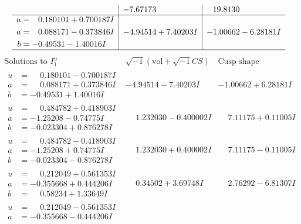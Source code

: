 \documentclass[1p]{elsarticle_modified}
\theoremstyle{definition}
\newcommand{\I}{\sqrt{-1}}
\begin{document}
$$\begin{array}{c|c|c}
 & -7.67173\phantom{ +0.000000I} & \phantom{-}19.8130\phantom{ +0.000000I} \\ \hline\begin{aligned}
u &= \phantom{-}0.180101 + 0.700187 I \\
a &= \phantom{-}0.088171 - 0.373846 I \\
b &= -0.49531 - 1.40016 I\end{aligned}
 & -4.94514 + 7.40203 I & -1.00662 - 6.28181 I\\
 \hline 
 \end{array}$$\newpage$$\begin{array}{c|c|c}  
\text{Solutions to }I^u_{1}& \I (\text{vol} + \sqrt{-1}CS) & \text{Cusp shape}\\
 \hline 
\begin{aligned}
u &= \phantom{-}0.180101 - 0.700187 I \\
a &= \phantom{-}0.088171 + 0.373846 I \\
b &= -0.49531 + 1.40016 I\end{aligned}
 & -4.94514 - 7.40203 I & -1.00662 + 6.28181 I \\ \hline\begin{aligned}
u &= \phantom{-}0.484782 + 0.418903 I \\
a &= -1.25208 - 0.74775 I \\
b &= -0.023304 + 0.876278 I\end{aligned}
 & \phantom{-}1.232030 - 0.400002 I & \phantom{-}7.11175 + 0.11005 I \\ \hline\begin{aligned}
u &= \phantom{-}0.484782 - 0.418903 I \\
a &= -1.25208 + 0.74775 I \\
b &= -0.023304 - 0.876278 I\end{aligned}
 & \phantom{-}1.232030 + 0.400002 I & \phantom{-}7.11175 - 0.11005 I \\ \hline\begin{aligned}
u &= \phantom{-}0.212049 + 0.561353 I \\
a &= -0.355668 + 0.444206 I \\
b &= \phantom{-}0.58234 + 1.33649 I\end{aligned}
 & \phantom{-}0.34502 + 3.69748 I & \phantom{-}2.76292 - 6.81307 I \\ \hline\begin{aligned}
u &= \phantom{-}0.212049 - 0.561353 I \\
a &= -0.355668 - 0.444206 I \\

\end{aligned}
\end{array}$$
\end{document}
